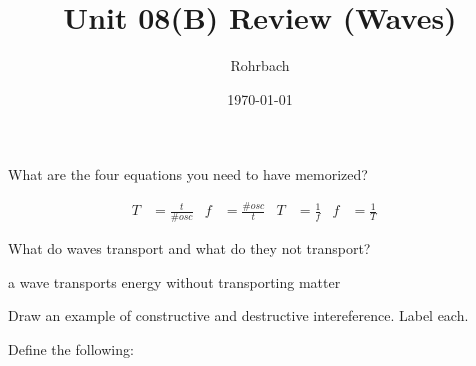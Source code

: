 \documentclass[10pt]{exam}
\title{Unit 08(B) Review (Waves)}
\author{Rohrbach}
\date{\today}
\begin{document}
\maketitle

\begin{questions}

\question
  What are the four equations you need to have memorized?

  \begin{solution}[\stretch{2}]
    \begin{align*}
      T &= \frac{t}{\#osc} &
      f &= \frac{\#osc}{t} &
      T &= \frac{1}{f} &
      f &= \frac{1}{T} &
    \end{align*}
  \end{solution}



\question
  What do waves transport and what do they not transport?

  \begin{solution}[\stretch{2}]
    a wave transports energy without transporting matter
  \end{solution}

\question
  Draw an example of constructive and destructive intereference.  Label each.

  \begin{solution}[\stretch{2}]
    
  \end{solution}

\question
  Define the following:

\end{questions}
\end{document}
